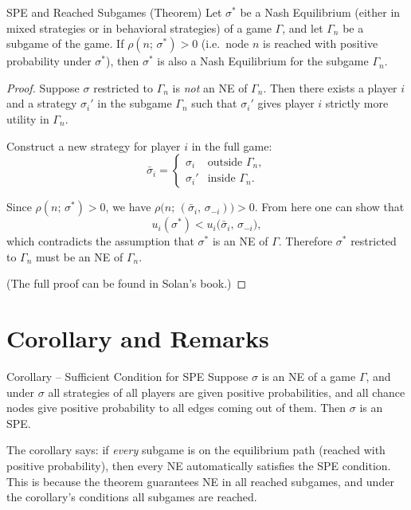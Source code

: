 \documentclass[12pt, a4paper]{article}
\begin{document}
\begin{thmbox}{SPE and Reached Subgames (Theorem)}
  Let $\sigma^*$ be a Nash Equilibrium (either in mixed strategies or in
  behavioral strategies) of a game $\Gamma$, and let $\Gamma_n$ be a subgame
  of the game.  If $\rho(n;\, \sigma^*) > 0$ (i.e.\ node $n$ is reached
  with positive probability under $\sigma^*$), then $\sigma^*$ is also a
  Nash Equilibrium for the subgame $\Gamma_n$.
\end{thmbox}

\begin{proof}
  Suppose $\sigma$ restricted to $\Gamma_n$ is \emph{not} an NE of
  $\Gamma_n$. Then there exists a player $i$ and a strategy $\sigma_i'$ in
  the subgame $\Gamma_n$ such that $\sigma_i'$ gives player $i$ strictly more
  utility in $\Gamma_n$.

  Construct a new strategy for player $i$ in the full game:
  \[
    \bar{\sigma}_i =
    \begin{cases}
      \sigma_i  & \text{outside } \Gamma_n, \\
      \sigma_i' & \text{inside } \Gamma_n.
    \end{cases}
  \]

  Since $\rho(n;\, \sigma^*) > 0$, we have
  $\rho\!\bigl(n;\, (\bar{\sigma}_i,\, \sigma_{-i})\bigr) > 0$.
  From here one can show that
  \[
    u_i(\sigma^*) < u_i\!\bigl(\bar{\sigma}_i,\, \sigma_{-i}\bigr),
  \]
  which contradicts the assumption that $\sigma^*$ is an NE of $\Gamma$.
  Therefore $\sigma^*$ restricted to $\Gamma_n$ must be an NE of $\Gamma_n$.

  \medskip
  \noindent (The full proof can be found in Solan's book.)
\end{proof}

\section{Corollary and Remarks}

\begin{propbox}{Corollary -- Sufficient Condition for SPE}
  Suppose $\sigma$ is an NE of a game $\Gamma$, and under $\sigma$ all
  strategies of all players are given positive probabilities, and all chance
  nodes give positive probability to all edges coming out of them.  Then
  $\sigma$ is an SPE.
\end{propbox}

\begin{notebox}
  The corollary says: if \emph{every} subgame is on the equilibrium path
  (reached with positive probability), then every NE automatically satisfies
  the SPE condition.  This is because the theorem guarantees NE in all
  reached subgames, and under the corollary's conditions all subgames are
  reached.
\end{notebox}
\end{document}
